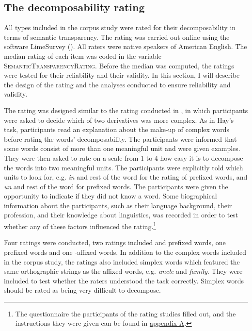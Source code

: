 






\subsection{The decomposability rating} \label{decomposability rating corpus}

All types included in the corpus study were rated for their decomposability in terms of semantic transparency. The rating was carried out online using the software LimeSurvey (\citealt{LimeSurveyProjectTeam.2015}). All raters were native speakers of American English. The median rating of each item was coded in the variable  \textsc{SemanticTransparencyRating}. Before the median was computed, the ratings were tested for their reliability and their validity. In this section, I will describe the design of the rating and the analyses conducted to ensure reliability and validity. 

The rating was designed similar to the rating conducted in \cite{Hay.2001}, in which participants were asked to decide which of two derivatives was more complex. As in Hay's task,  participants read an explanation about the make-up of complex words before rating the words' decomposability.  The participants were informed that some words consist of more than one meaningful unit and were given examples. 
They were then asked to rate on a scale from 1 to 4 how easy it is to decompose the words into two meaningful units. The participants were explicitly told which units to look for, e.g.\textit{ in} and rest of the word for the rating of prefixed words, and \textit{un} and rest of the word for prefixed words. The participants were given the opportunity to  indicate if they did not know a word. 
Some biographical information about the participants, such as their language background, their profession, and their knowledge about linguistics, was recorded in order to test whether any of these factors influenced the rating.\footnote{The questionnaire the participants of the rating studies filled out, and the instructions they were given can be found in \hyperref[Appendix A: Decomposability Rating]{appendix A}. } 

Four ratings were conducted, two ratings included  and prefixed words, one  prefixed words and one -affixed words. In addition to the complex words included in the corpus study, the ratings also included simplex words which featured the same orthographic strings as the affixed words, e.g. \textit{{un}cle} and \textit{fami{ly}}. They were included to test whether the raters understood the task correctly. Simplex words should be rated as being very difficult to decompose. 

